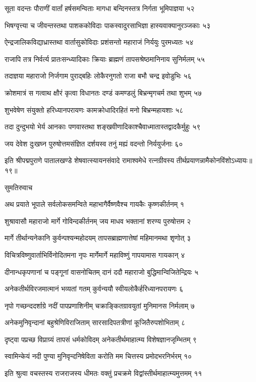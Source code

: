 सूता वदन्तः पौराणीं वार्तां हर्षसमन्विताः
मागधा बन्दिनस्तत्र निर्गता भूमिपाज्ञया ५२

भिषग्वृत्त्या च जीवन्तस्तथा पाशककोविदाः
पाकस्वादुरसाभिज्ञा हास्यवाक्यानुरञ्जकाः ५३

ऐन्द्रजालिकविद्याध्रास्तथा वार्तासुकोविदाः
प्रशंसन्तो महाराजं निर्ययुः पुरमध्यतः ५४

राजापि तत्र निर्वर्त्य प्रातःसन्ध्यादिकाः क्रियाः
ब्राह्मणं तापसश्रेष्ठमानिनाय सुनिर्मलम् ५५

तदाज्ञया महाराजो निर्जगाम पुराद्बहिः
लोकैरनुगतो राजा बभौ चन्द्र इवोडुभिः ५६

क्रोशमात्रं स गत्वाथ क्षौरं कृत्वा विधानतः
दण्डं कमण्डलुं बिभ्रन्मृगचर्म तथा शुभम् ५७

शुभवेषेण संयुक्तो हरिध्यानपरायणः
कामक्रोधादिरहितं मनो बिभ्रन्महायशाः ५८

तदा दुन्दुभयो भेर्य आनकाः पणवास्तथा
शङ्खवीणादिकाश्चैवाध्मातास्तद्वादकैर्मुहुः ५९

जय देवेश दुःखघ्न पुरुषोत्तमसंज्ञित
दर्शयस्व तनुं मह्यं वदन्तो निर्ययुर्जनाः ६०

इति श्रीपद्मपुराणे पातालखण्डे शेषवात्स्यायनसंवादे रामाश्वमेधे रत्नग्रीवस्य तीर्थप्रयाणन्नामैकोनविंशोऽध्यायः॥१९॥


सुमतिरुवाच

अथ प्रयाते भूपाले सर्वलोकसमन्विते
महाभागैर्वैष्णवैश्च गायकैः कृष्णकीर्तनम् १

शुश्रावासौ महाराजो मार्गे गोविन्दकीर्तनम्
जय माधव भक्तानां शरण्य पुरुषोत्तम २

मार्गे तीर्थान्यनेकानि कुर्वन्पश्यन्महोदयम्
तापसब्राह्मणात्तेषां महिमानमथा शृणोत् ३

विचित्रविष्णुवार्ताभिर्विनोदितमना नृपः
मार्गेमार्गे महाविष्णुं गापयामास गायकान् ४

दीनान्धकृपणानां च पङ्गूनां वासनोचितम्
दानं ददौ महाराजो बुद्धिमान्विजितेन्द्रियः ५

अनेकतीर्थविरजमात्मानं भव्यतां गतम्
कुर्वन्ययौ स्वीयलोकैर्हरिध्यानपरायणः ६

नृपो गच्छन्ददर्शाग्रे नदीं पापप्रणाशिनीम्
चक्राङ्कितग्रावयुतां मुनिमानस निर्मलाम् ७

अनेकमुनिवृन्दानां बहुश्रेणिविराजिताम्
सारसादिपतत्रीणां कूजितैरुपशोभिताम् ८

दृष्ट्वा पप्रच्छ विप्राग्र्यं तापसं धर्मकोविदम्
अनेकतीर्थमाहात्म्य विशेषज्ञानजृम्भितम् ९

स्वामिन्केयं नदी पुण्या मुनिवृन्दनिषेविता
करोति मम चित्तस्य प्रमोदभरनिर्भरम् १०

इति श्रुत्वा वचस्तस्य राजराजस्य धीमतः
वक्तुं प्रचक्रमे विद्वांस्तीर्थमाहात्म्यमुत्तमम् ११

